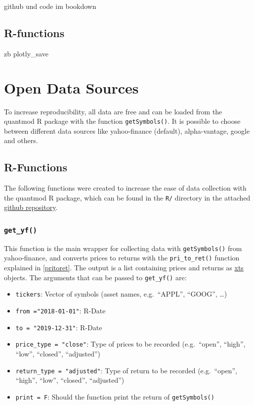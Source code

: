 \documentclass[
  oneside]{book}
\providecommand{\tightlist}{%
  \setlength{\itemsep}{0pt}\setlength{\parskip}{0pt}}
\begin{document}
github und code im bookdown

\hypertarget{r-functions}{%
\section{R-functions}\label{r-functions}}

zb plotly\_save

\hypertarget{open-data-sources}{%
\chapter{Open Data Sources}\label{open-data-sources}}

To increase reproducibility, all data are free and can be loaded from the quantmod R package with the function \texttt{getSymbols()}. It is possible to choose between different data sources like yahoo-finance (default), alpha-vantage, google and others.

\hypertarget{r-functions-1}{%
\section{R-Functions}\label{r-functions-1}}

The following functions were created to increase the ease of data collection with the quantmod R package, which can be found in the \texttt{R/} directory in the attached \href{https://github.com/AxelCode-R/Master-Thesis}{github repository}.

\hypertarget{get_yf}{%
\subsection{\texorpdfstring{\texttt{get\_yf()}}{get\_yf()}}\label{get_yf}}

This function is the main wrapper for collecting data with \texttt{getSymbols()} from yahoo-finance, and converts prices to returns with the \texttt{pri\_to\_ret()} function explained in \ref{pritoret}. The output is a list containing prices and returns as \href{https://cran.r-project.org/web/packages/xts/xts.pdf}{xts} objects. The arguments that can be passed to \texttt{get\_yf()} are:

\begin{itemize}
\tightlist
\item
  \texttt{tickers}: Vector of symbols (asset names, e.g.~``APPL'', ``GOOG'', \ldots)
\item
  \texttt{from\ ="2018-01-01"}: R-Date
\item
  \texttt{to\ =\ "2019-12-31"}: R-Date
\item
  \texttt{price\_type\ =\ "close"}: Type of prices to be recorded (e.g.~``open'', ``high'', ``low'', ``closed'', ``adjusted'')
\item
  \texttt{return\_type\ =\ "adjusted"}: Type of return to be recorded (e.g.~``open'', ``high'', ``low'', ``closed'', ``adjusted'')
\item
  \texttt{print\ =\ F}: Should the function print the return of \texttt{getSymbols()}
\end{itemize}
\end{document}
